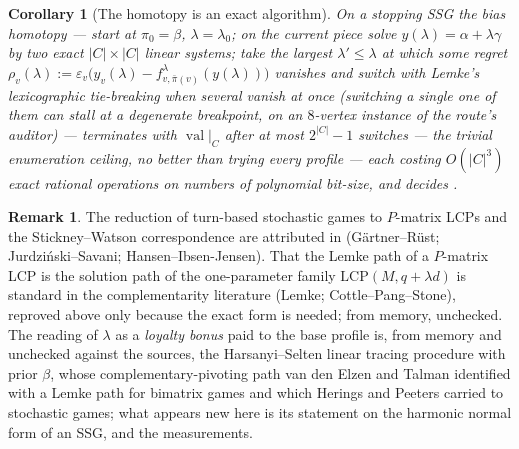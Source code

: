 \documentclass[11pt]{article}
\theoremstyle{plain}
\newtheorem{corollary}[theorem]{Corollary}
\theoremstyle{definition}
\newtheorem{remark}[theorem]{Remark}
\DeclareMathOperator{\val}{val}
\begin{document}
\begin{corollary}[The homotopy is an exact algorithm]\label{cor:bias-algorithm}
On a stopping SSG the \emph{bias homotopy} --- start at $\pi_0=\beta$,
$\lambda=\lambda_0$; on the current piece solve
$y(\lambda)=\alpha+\lambda\gamma$ by two exact $|C|\times|C|$ linear systems;
take the largest $\lambda'\le\lambda$ at which some regret
$\rho_v(\lambda):=\varepsilon_v\bigl(y_v(\lambda)-
f^{\lambda}_{v,\bar\pi(v)}(y(\lambda))\bigr)$ vanishes and switch with
Lemke's lexicographic tie-breaking when several vanish at once (switching
a single one of them can stall at a degenerate breakpoint, on an
$8$-vertex instance of the route's auditor) --- terminates with $\val|_C$
after at most $2^{|C|}-1$ switches --- the
trivial enumeration ceiling, no better than trying every profile --- each
costing $O(|C|^{3})$ exact rational operations on numbers of polynomial
bit-size, and decides .
\end{corollary}

\begin{remark}\label{rem:bias-attribution}
The reduction of turn-based stochastic games to $P$-matrix LCPs and the
Stickney--Watson correspondence are attributed in 
(G\"artner--R\"ust; Jurdzi\'nski--Savani; Hansen--Ibsen-Jensen). That the
Lemke path of a $P$-matrix LCP is the solution path of the one-parameter
family $\mathrm{LCP}(M,q+\lambda d)$ is standard in the complementarity
literature (Lemke; Cottle--Pang--Stone), reproved above only because the
exact form is needed; from memory, unchecked. The reading of $\lambda$ as
a \emph{loyalty bonus} paid to the base profile is, from memory and
unchecked against the sources, the Harsanyi--Selten linear tracing
procedure with prior $\beta$, whose complementary-pivoting path van den
Elzen and Talman identified with a Lemke path for bimatrix games and
which Herings and Peeters carried to stochastic games; what appears new
here is its statement on the harmonic normal form of an SSG,
 and the measurements.
\end{remark}
\end{document}
